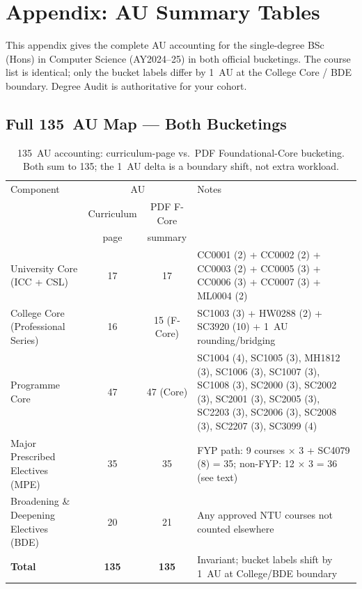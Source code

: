 \chapter{Appendix: AU Summary Tables}
\label{ch:appendix-au}

This appendix gives the complete AU accounting for the single-degree BSc (Hons) in Computer Science (AY2024--25) in both official bucketings. The course list is identical; only the bucket labels differ by 1~AU at the College Core / BDE boundary. Degree Audit is authoritative for your cohort.

\section{Full 135~AU Map --- Both Bucketings}
\label{sec:au-buckets-table}

\begin{table}[h]
\centering
\small
\renewcommand{\arraystretch}{1.25}
\setlength{\tabcolsep}{3pt}\footnotesize\begin{tabular}{@{}p{3.6cm} c c p{6.0cm}@{}}
\toprule
Component & \multicolumn{2}{c}{AU} & Notes \\
 & Curriculum & PDF F-Core & \\
 & page & summary & \\
\midrule
University Core (ICC + CSL) & 17 & 17 & CC0001 (2) + CC0002 (2) + CC0003 (2) + CC0005 (3) + CC0006 (3) + CC0007 (3) + ML0004 (2) \\
College Core (Professional Series) & 16 & 15 (F-Core) & SC1003 (3) + HW0288 (2) + SC3920 (10) + 1~AU rounding/bridging \\
Programme Core & 47 & 47 (Core) & SC1004 (4), SC1005 (3), MH1812 (3), SC1006 (3), SC1007 (3), SC1008 (3), SC2000 (3), SC2002 (3), SC2001 (3), SC2005 (3), SC2203 (3), SC2006 (3), SC2008 (3), SC2207 (3), SC3099 (4) \\
Major Prescribed Electives (MPE) & 35 & 35 & FYP path: 9 courses $\times$ 3 + SC4079 (8) = 35; non-FYP: 12 $\times$ 3 = 36 (see text) \\
Broadening \& Deepening Electives (BDE) & 20 & 21 & Any approved NTU courses not counted elsewhere \\
\midrule
\textbf{Total} & \textbf{135} & \textbf{135} & Invariant; bucket labels shift by 1~AU at College/BDE boundary \\
\bottomrule
\end{tabular}
\caption{135~AU accounting: curriculum-page vs.\ PDF Foundational-Core bucketing. Both sum to 135; the 1~AU delta is a boundary shift, not extra workload.}
\label{tab:au-buckets}
\end{table}

